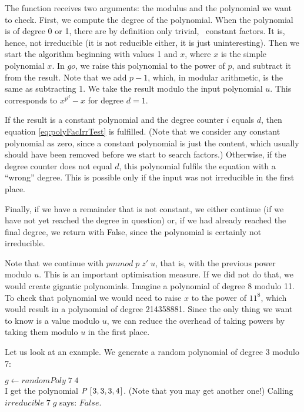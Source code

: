\documentclass[tikz]{scrreprt}
\newcommand{\Conid}[1]{\mathit{#1}}
\newcommand{\Varid}[1]{\mathit{#1}}
\begin{document}
The function receives two arguments: the modulus and 
the polynomial we want to check.
First, we compute the degree of the polynomial.
When the polynomial is of degree 0 or 1, 
there are by definition only trivial, \ie\ constant factors.
It is, hence, not irreducible (it is not reducible either, 
it is just uninteresting).
Then we start the algorithm beginning with values 1 and
$x$, where $x$ is the simple polynomial $x$.
In \ensuremath{\Varid{go}}, we raise this polynomial to the power of $p$,
and subtract it from the result.
Note that we add $p-1$, which,
in modular arithmetic, is the same as subtracting 1. 
We take the result modulo the input polynomial \ensuremath{\Varid{u}}. 
This corresponds to
$x^{p^d} - x$ for degree $d=1$.

If the result is a constant polynomial 
and the degree counter $i$ equals $d$,
then equation \ref{eq:polyFacIrrTest} is fulfilled.
(Note that we consider any constant polynomial as zero,
since a constant polynomial is just the content,
which usually should have been removed before we start
to search factors.)
Otherwise, if the degree counter does not equal $d$,
this polynomial fulfils the equation with a ``wrong'' degree.
This is possible only if the input was not irreducible
in the first place.

Finally, if we have a remainder that is not constant,
we either continue (if we have not yet reached the degree
in question) or, if we had already reached the final degree,
we return with False, since the polynomial 
is certainly not irreducible.

Note that we continue with \ensuremath{\Varid{pmmod}\;\Varid{p}\;\Varid{z'}\;\Varid{u}}, that is,
with the previous power modulo $u$. This is an important
optimisation measure. If we did not do that,
we would create gigantic polynomials. Imagine
a polynomial of degree 8 modulo 11. To check that polynomial
we would need to raise $x$ to the power of $11^8$,
which would result in a polynomial of degree \num{214358881}.
Since the only thing we want to know is
a value modulo $u$, we can reduce the overhead of taking powers
by taking them modulo $u$ in the first place.

Let us look at an example.
We generate a random polynomial of degree 3 modulo 7:

\ensuremath{\Varid{g}\leftarrow \Varid{randomPoly}\;\mathrm{7}\;\mathrm{4}}\\

I get the polynomial \ensuremath{\Conid{P}\;[\mskip1.5mu \mathrm{3},\mathrm{3},\mathrm{3},\mathrm{4}\mskip1.5mu]}.
(Note that you may get another one!)
Calling \ensuremath{\Varid{irreducible}\;\mathrm{7}\;\Varid{g}} says: \ensuremath{\Conid{False}}.
\end{document}
